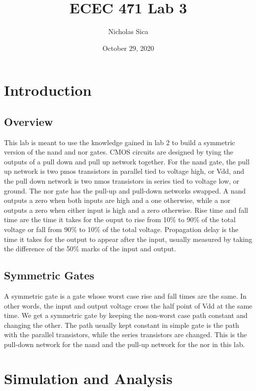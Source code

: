 \documentclass[12pt]{article}
\begin{document}
\title{ECEC 471 Lab 3}
\author{Nicholas Sica}
\date{October 29, 2020}
\maketitle

\section{Introduction}
\subsection{Overview}
This lab is meant to use the knowledge gained in lab 2 to build a symmetric version of the nand and nor gates.
CMOS circuits are designed by tying the outputs of a pull down and pull up network together. For the nand gate, the pull up network is two pmos transistors in parallel tied to
voltage high, or Vdd, and the pull down network is two nmos transistors in series tied to voltage low, or ground. The nor gate has the pull-up and pull-down networks swapped.
A nand outputs a zero when both inputs are high and a one otherwise, while a nor outputs a zero when either input is high and a zero otherwise.
Rise time and fall time are the time it takes for the ouput to rise from 10\% to 90\% of the total voltage or fall from 90\% to 10\% of the total voltage.
Propagation delay is the time it takes for the output to appear after the input, usually measured by taking the difference of the 50\% marks of the input and output.
\subsection{Symmetric Gates}
A symmetric gate is a gate whose worst case rise and fall times are the same. In other words, the input and output voltage cross the half point of Vdd at the same time. We get a
symmetric gate by keeping the non-worst case path constant and changing the other. The path usually kept constant in simple gate is the path with the parallel transistors, while
the series transistors are changed. This is the pull-down network for the nand and the pull-up network for the nor in this lab.
\section{Simulation and Analysis}
\end{document}
